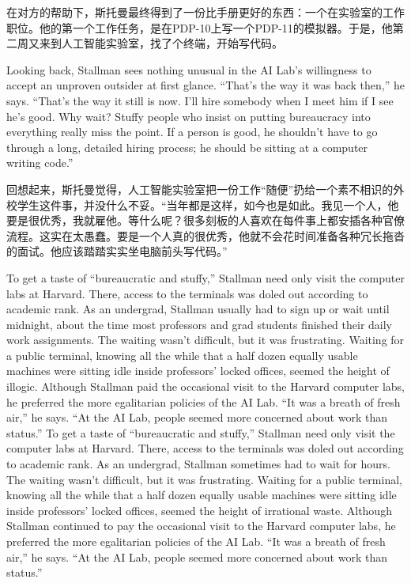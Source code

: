 \ifdefined\chs
在对方的帮助下，斯托曼最终得到了一份比手册更好的东西：一个在实验室的工作职位。他的第一个工作任务，是在PDP-10上写一个PDP-11的模拟器。于是，他第二周又来到人工智能实验室，找了个终端，开始写代码。
\fi

\ifdefined\eng
Looking back, Stallman sees nothing unusual in the AI Lab's willingness to accept an unproven outsider at first glance. ``That's the way it was back then,'' he says. ``That's the way it still is now. I'll hire somebody when I meet him if I see he's good. Why wait? Stuffy people who insist on putting bureaucracy into everything really miss the point. If a person is good, he shouldn't have to go through a long, detailed hiring process; he should be sitting at a computer writing code.''
\fi

\ifdefined\chs
回想起来，斯托曼觉得，人工智能实验室把一份工作``随便''扔给一个素不相识的外校学生这件事，并没什么不妥。``当年都是这样，如今也是如此。我见一个人，他要是很优秀，我就雇他。等什么呢？很多刻板的人喜欢在每件事上都安插各种官僚流程。这实在太愚蠢。要是一个人真的很优秀，他就不会花时间准备各种冗长拖沓的面试。他应该踏踏实实坐电脑前头写代码。''
\fi

\ifdefined\eng
\ifdefined\vone
To get a taste of ``bureaucratic and stuffy,'' Stallman need only visit the computer labs at Harvard. There, access to the terminals was doled out according to academic rank. As an undergrad, Stallman usually had to sign up or wait until midnight, about the time most professors and grad students finished their daily work assignments. The waiting wasn't difficult, but it was frustrating. Waiting for a public terminal, knowing all the while that a half dozen equally usable machines were sitting idle inside professors' locked offices, seemed the height of illogic. Although Stallman paid the occasional visit to the Harvard computer labs, he preferred the more egalitarian policies of the AI Lab. ``It was a breath of fresh air,'' he says. ``At the AI Lab, people seemed more concerned about work than status.''
\fi
\ifdefined\vtwo
To get a taste of ``bureaucratic and stuffy,'' Stallman need only visit the computer labs at Harvard. There, access to the terminals was doled out according to academic rank. As an undergrad, Stallman sometimes had to wait for hours. The waiting wasn't difficult, but it was frustrating. Waiting for a public terminal, knowing all the while that a half dozen equally usable machines were sitting idle inside professors' locked offices, seemed the height of irrational waste. Although Stallman continued to pay the occasional visit to the Harvard computer labs, he preferred the more egalitarian policies of the AI Lab. ``It was a breath of fresh air,'' he says. ``At the AI Lab, people seemed more concerned about work than status.''
\fi
\fi

